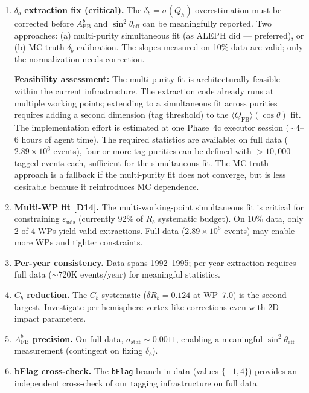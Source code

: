 \documentclass[11pt,a4paper]{article}
\begin{document}
\begin{enumerate}
\item \textbf{$\delta_b$ extraction fix (critical).} The $\delta_b = \sigma(Q_h)$
overestimation must be corrected before $A_\mathrm{FB}^b$ and
$\sin^2\theta_\mathrm{eff}$ can be meaningfully reported. Two approaches:
(a) multi-purity simultaneous fit (as ALEPH did --- preferred), or
(b) MC-truth $\delta_b$ calibration. The slopes measured on 10\% data are valid;
only the normalization needs correction.

\textbf{Feasibility assessment:} The multi-purity fit is architecturally feasible
within the current infrastructure. The extraction code already runs at multiple
working points; extending to a simultaneous fit across purities requires adding a
second dimension (tag threshold) to the $\langle Q_\mathrm{FB} \rangle(\cos\theta)$
fit. The implementation effort is estimated at one Phase~4c executor session
($\sim 4$--6 hours of agent time). The required statistics are available: on full
data ($2.89 \times 10^6$ events), four or more tag purities can be defined with
$> 10{,}000$ tagged events each, sufficient for the simultaneous fit. The MC-truth
approach is a fallback if the multi-purity fit does not converge, but is less
desirable because it reintroduces MC dependence.

\item \textbf{Multi-WP fit [D14].} The multi-working-point simultaneous fit is
critical for constraining $\varepsilon_\mathrm{uds}$ (currently 92\% of $R_b$
systematic budget). On 10\% data, only 2 of 4 WPs yield valid extractions.
Full data ($2.89 \times 10^6$ events) may enable more WPs and tighter constraints.

\item \textbf{Per-year consistency.} Data spans 1992--1995; per-year extraction
requires full data ($\sim 720$K events/year) for meaningful statistics.

\item \textbf{$C_b$ reduction.} The $C_b$ systematic ($\delta R_b = 0.124$ at WP~7.0)
is the second-largest. Investigate per-hemisphere vertex-like corrections even
with 2D impact parameters.

\item \textbf{$A_\mathrm{FB}^b$ precision.} On full data,
$\sigma_\mathrm{stat} \sim 0.0011$, enabling a meaningful
$\sin^2\theta_\mathrm{eff}$ measurement (contingent on fixing $\delta_b$).

\item \textbf{bFlag cross-check.} The \texttt{bFlag} branch in data (values $\{-1, 4\}$)
provides an independent cross-check of our tagging infrastructure on full data.
\end{enumerate}
\end{document}
